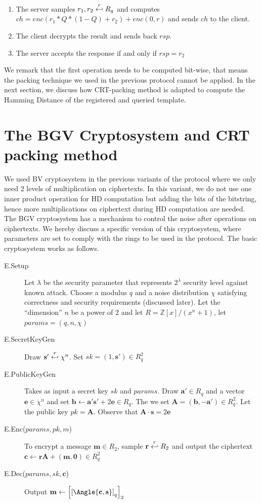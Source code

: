\begin{enumerate}
\item The server samples \(r_{1}, r_{2} \stackrel{r}{\hookleftarrow} R_{q}\) and computes
    \(ch = enc(r_{1}*Q*(1-Q) + r_{2}) + enc(0,r)\) and sends \(ch\) to the
    client.
\item The client decrypts the result and sends back \(rsp\).
\item The server accepts the response if and only if \(rsp = r_{2} \)
\end{enumerate}
We remark that the first operation needs to be computed bit-wise, that means the
packing technique we used in the previous protocol cannot be applied. In the
next section, we discuss how CRT-packing method \cite{smart2014fully} is adapted
to compute the Hamming Distance of the registered and queried template.

\section{The BGV Cryptosystem and CRT packing method}
\label{sec:6bgv}

We used BV cryptosystem \cite{brakerski2011fully} in the previous variants of
the protocol where we only need 2 levels of multiplication on ciphertexts. In
this variant, we do not use one inner product operation for HD computation but
adding the bits of the bitstring, hence more multiplications on ciphertext
during HD computation are needed. The BGV cryptosystem
\cite{brakerski2014leveled} has a mechanism to control the noise after
operations on ciphertexts. We hereby discuss a specific version of this
cryptosystem, where parameters are set to comply with the rings to be used in
the protocol. The basic cryptosystem works as follows.

\begin{description}
\item[E.Setup] Let $\lambda$ be the security parameter that represents
  $2^{\lambda}$ security level against known attack. Choose a modulus $q$ and a
  noise distribution $\chi$ satisfying correctness and security requirements
  (discussed later). Let the ``dimension'' $n$ be a power of 2 and let
  $R = \mathbb{Z}[x] / (x^{n} + 1)$, let $params = (q, n, \chi)$
\item[E.SecretKeyGen] Draw $\mathbf{s'} \stackrel{r}{\hookleftarrow} \chi^{n}$. Set $sk = (1,\mathbf{s'}) \in R_{q}^{2}$
\item[E.PublicKeyGen] Takes as input a secret key $sk$ and $params$. Draw
  $\mathbf{a'} \in R_{q}$ and a vector $\mathbf{e} \in \chi^{n}$ and set
  $\mathbf{b} \gets \mathbf{a's'} + 2\mathbf{e} \in R_{q}$. The we set
  $\mathbf{A} = (\mathbf{b}, -\mathbf{a'}) \in R_{q}^{2}$. Let the public key
  $pk = \mathbf{A}$. Observe that $\mathbf{A} \cdot \mathbf{s} = 2\mathbf{e}$
\item[E.Enc($params, pk, m$)] To encrypt a message $\mathbf{m} \in R_{2}$,
  sample $\mathbf{r} \stackrel{r}{\hookleftarrow} R_{2}$ and output the ciphertext
  $\mathbf{c} \gets \mathbf{r}\mathbf{A} + \mathbf{(m,0)} \in R_{q}^{2}$
\item[E.Dec($params,sk,\mathbf{c}$)] Output
  $\mathbf{m} \gets
  \left[\left[\Angle{\mathbf{c},\mathbf{s}}\right]_{q}\right]_{2}$
\end{description}

